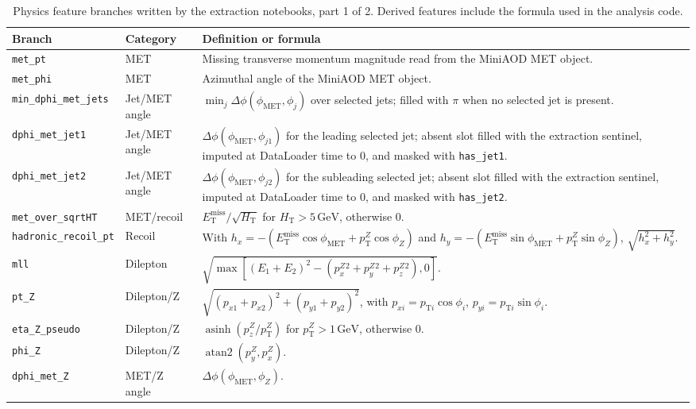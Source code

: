 \documentclass[11pt,a4paper,twocolumn]{article}
\newcommand{\GeV}{\text{GeV}}
\newcommand{\MET}{\ensuremath{E_{\mathrm{T}}^{\mathrm{miss}}}}
\begin{document}
\begin{table}[h]
\centering
\scriptsize
\caption{Physics feature branches written by the extraction notebooks, part 1 of 2. Derived features include the formula used in the analysis code.}
\label{tab:appendix-features}
\begin{tabular}{L{0.18\textwidth}L{0.16\textwidth}L{0.58\textwidth}}
\toprule
Branch & Category & Definition or formula \\
\midrule
\texttt{met\_pt} & MET & Missing transverse momentum magnitude read from the MiniAOD MET object. \\
\texttt{met\_phi} & MET & Azimuthal angle of the MiniAOD MET object. \\
\texttt{min\_dphi\_met\_jets} & Jet/MET angle & \(\min_j \Delta\phi(\phi_{\mathrm{MET}},\phi_j)\) over selected jets; filled with \(\pi\) when no selected jet is present. \\
\texttt{dphi\_met\_jet1} & Jet/MET angle & \(\Delta\phi(\phi_{\mathrm{MET}},\phi_{j1})\) for the leading selected jet; absent slot filled with the extraction sentinel, imputed at DataLoader time to \(0\), and masked with \texttt{has\_jet1}. \\
\texttt{dphi\_met\_jet2} & Jet/MET angle & \(\Delta\phi(\phi_{\mathrm{MET}},\phi_{j2})\) for the subleading selected jet; absent slot filled with the extraction sentinel, imputed at DataLoader time to \(0\), and masked with \texttt{has\_jet2}. \\
\texttt{met\_over\_sqrtHT} & MET/recoil & \(\MET/\sqrt{H_{\mathrm{T}}}\) for \(H_{\mathrm{T}}>5\,\GeV\), otherwise 0. \\
\texttt{hadronic\_recoil\_pt} & Recoil & With \(h_x=-(\MET\cos\phi_{\mathrm{MET}}+p_{\mathrm{T}}^Z\cos\phi_Z)\) and \(h_y=-(\MET\sin\phi_{\mathrm{MET}}+p_{\mathrm{T}}^Z\sin\phi_Z)\), \(\sqrt{h_x^2+h_y^2}\). \\
\texttt{mll} & Dilepton & \(\sqrt{\max[(E_1+E_2)^2-(p_x^Z{}^2+p_y^Z{}^2+p_z^Z{}^2),0]}\). \\
\texttt{pt\_Z} & Dilepton/Z & \(\sqrt{(p_{x1}+p_{x2})^2+(p_{y1}+p_{y2})^2}\), with \(p_{xi}=p_{\mathrm{T}i}\cos\phi_i\), \(p_{yi}=p_{\mathrm{T}i}\sin\phi_i\). \\
\texttt{eta\_Z\_pseudo} & Dilepton/Z & \(\operatorname{asinh}(p_z^Z/p_{\mathrm{T}}^Z)\) for \(p_{\mathrm{T}}^Z>1\,\GeV\), otherwise 0. \\
\texttt{phi\_Z} & Dilepton/Z & \(\operatorname{atan2}(p_y^Z,p_x^Z)\). \\
\texttt{dphi\_met\_Z} & MET/Z angle & \(\Delta\phi(\phi_{\mathrm{MET}},\phi_Z)\). \\

\end{tabular}
\end{table}
\end{document}

